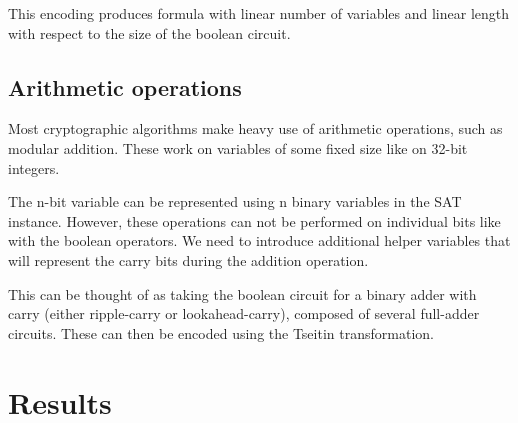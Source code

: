 This encoding produces formula with linear number of variables and linear length with respect to the size of the boolean circuit.

\section{Arithmetic operations}
Most cryptographic algorithms make heavy use of arithmetic operations, such as modular addition.
These work on variables of some fixed size like on 32-bit integers.

The n-bit variable can be represented using n binary variables in the SAT instance.
However, these operations can not be performed on individual bits like with the boolean operators.
We need to introduce additional helper variables that will represent the carry bits during the addition operation.

This can be thought of as taking the boolean circuit for a binary adder with carry (either ripple-carry or lookahead-carry), composed of several full-adder circuits.
These can then be encoded using the Tseitin transformation.


\chapter{Results}


